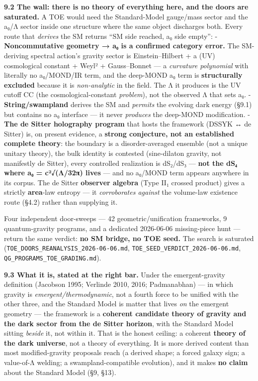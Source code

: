 \documentclass[
]{article}
\begin{document}
\textbf{9.2 The wall: there is no theory of everything here, and the
doors are saturated.} A TOE would need the Standard-Model gauge/mass
sector and the a₀/Λ sector inside one structure where the same object
discharges both. Every route that \emph{derives} the SM returns ``SM
side reached, a₀ side empty'': - \textbf{Noncommutative geometry → a₀ is
a confirmed category error.} The SM-deriving spectral action's gravity
sector is Einstein--Hilbert + a (UV) cosmological constant + Weyl² +
Gauss--Bonnet --- a \emph{curvature polynomial} with literally no
a₀/MOND/IR term, and the deep-MOND a₀ term is \textbf{structurally
excluded} because it is \emph{non-analytic} in the field. The Λ it
produces is the UV cutoff CC (the cosmological-constant \emph{problem}),
not the observed Λ that sets a₀. - \textbf{String/swampland} derives the
SM and \emph{permits} the evolving dark energy (§9.1) but contains no a₀
interface --- it never \emph{produces} the deep-MOND modification. -
\textbf{The de Sitter holography program} that hosts the framework
(DSSYK ↔ de Sitter) is, on present evidence, a \textbf{strong
conjecture, not an established complete theory}: the boundary is a
disorder-averaged ensemble (not a unique unitary theory), the bulk
identity is contested (sine-dilaton gravity, not manifestly de Sitter),
every controlled realization is dS₂/dS₃ --- \textbf{not the dS₄ where a₀
= c²√(Λ/32π) lives} --- and no a₀/MOND term appears anywhere in its
corpus. The de Sitter \textbf{observer algebra} (Type II₁ crossed
product) gives a strictly \textbf{area}-law entropy --- it
\emph{corroborates against} the volume-law existence route (§4.2) rather
than supplying it.

Four independent door-sweeps --- 42 geometric/unification frameworks, 9
quantum-gravity programs, and a dedicated 2026-06-06 missing-piece hunt
--- return the same verdict: \textbf{no SM bridge, no TOE seed.} The
search is saturated (\texttt{TOE\_DOORS\_REANALYSIS\_2026-06-06.md},
\texttt{TOE\_SEED\_VERDICT\_2026-06-06.md},
\texttt{QG\_PROGRAMS\_TOE\_GRADING.md}).

\textbf{9.3 What it is, stated at the right bar.} Under the
emergent-gravity definition (Jacobson 1995; Verlinde 2010, 2016;
Padmanabhan) --- in which gravity is \emph{emergent/thermodynamic}, not
a fourth force to be unified with the other three, and the Standard
Model is matter that lives \emph{on} the emergent geometry --- the
framework is a \textbf{coherent candidate theory of gravity and the dark
sector from the de Sitter horizon}, with the Standard Model sitting
\emph{beside} it, not within it. That is the honest ceiling: a coherent
\textbf{theory of the dark universe}, not a theory of everything. It is
more derived content than most modified-gravity proposals reach (a
derived shape; a forced galaxy sign; a value-of-Λ welding; a
swampland-compatible evolution), and it makes \textbf{no claim} about
the Standard Model (§9, §13).
\end{document}
